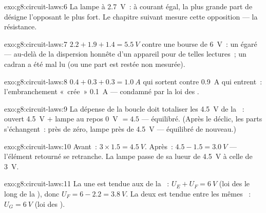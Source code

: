 \begin{solution}{exo:g8:circuit-laws:6}
La lampe à \qty{2.7}{V}~: à courant égal, la plus grande part de
 désigne l'opposant le plus fort. Le chapitre suivant mesure
cette opposition --- la résistance.
\end{solution}

\begin{solution}{exo:g8:circuit-laws:7}
$2.2 + 1.9 + 1.4 = \qty{5.5}{V}$ contre une bourse de \qty{6}{V}~:
un  égaré --- au-delà de la dispersion honnête d'un appareil
pour de telles lectures~; un cadran a été mal lu (ou une part est
restée non mesurée).
\end{solution}

\begin{solution}{exo:g8:circuit-laws:8}
$0.4 + 0.3 + 0.3 = \qty{1.0}{A}$ qui sortent contre \qty{0.9}{A} qui
entrent~: l'embranchement «~crée~» \qty{0.1}{A} --- condamné par la
loi des .
\end{solution}

\begin{solution}{exo:g8:circuit-laws:9}
La dépense de la boucle doit totaliser les \qty{4.5}{V} de la ~:
 ouvert \qty{4.5}{V} $+$ lampe au repos \qty{0}{V}
$= 4.5$ --- équilibré. (Après le déclic, les parts s'échangent~:
 près de zéro, lampe près de \qty{4.5}{V} --- équilibré
de nouveau.)
\end{solution}

\begin{solution}{exo:g8:circuit-laws:10}
Avant~: $3 \times 1.5 = \qty{4.5}{V}$. Après~:
$4.5 - 1.5 = \qty{3.0}{V}$ --- l'élément retourné se retranche. La
lampe passe de sa lueur de \qty{4.5}{V} à celle de \qty{3}{V}.
\end{solution}

\begin{solution}{exo:g8:circuit-laws:11}
La  une est tendue aux  de la ~:
$U_E + U_F = \qty{6}{V}$ (loi des   le long de la
), donc $U_F = 6 - 2.2 = \qty{3.8}{V}$. La  deux est
tendue entre les mêmes ~: $U_G = \qty{6}{V}$ (loi des 
).
\end{solution}

